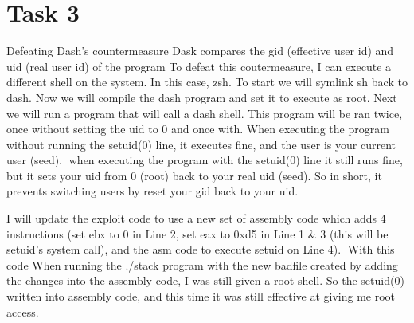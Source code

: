 \documentclass[14pt]{extarticle}
\begin{document}
\section{Task 3}
Defeating Dash's countermeasure
Dask compares the gid (effective user id) and uid (real user id) of the program 
To defeat this coutermeasure, I can execute a different shell on the system. In this case, zsh. 
To start we will symlink sh back to dash. 
Now we will compile the dash program and set it to execute as root.
Next we will run a program that will call a dash shell. This program will be ran twice, once without setting the uid to 0 and once with. When executing the program without running the setuid(0) line, it executes fine, and the user is your current user (seed). when executing the program with the setuid(0) line it still runs fine, but it sets your uid from 0 (root) back to your real uid (seed). So in short, it prevents switching users by reset your gid back to your uid.

I will update the exploit code to use a new set of assembly code which adds 4 instructions (set ebx to 0 in Line 2, set eax to 0xd5 in Line 1 \& 3 (this will be setuid's system call), and the asm code to execute setuid on Line 4). With this code 
When running the ./stack program with the new badfile created by adding the changes into the assembly code, I was still given a root shell. So the setuid(0) written into assembly code, and this time it was still effective at giving me root access. 
 
\newpage


\end{document}
